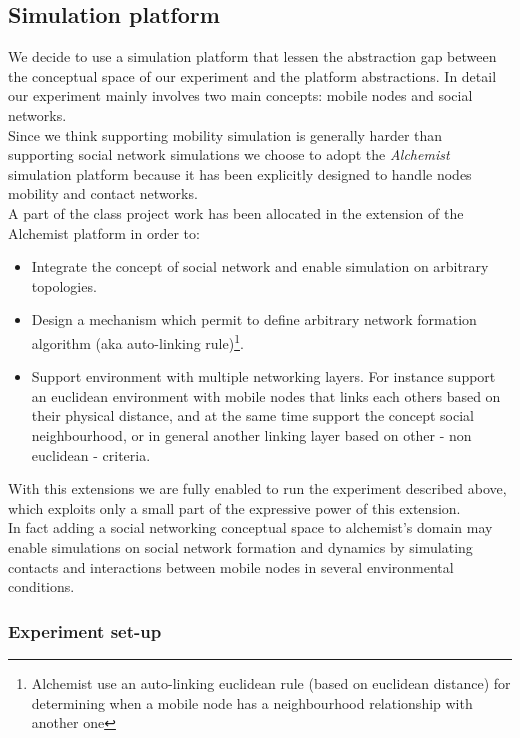 \subsection{Simulation platform}
\label{exp_platform}

We decide to use a simulation platform that lessen the abstraction gap between the conceptual space of our experiment and the platform abstractions. In detail our experiment mainly involves two main concepts: mobile nodes and social networks.\\
Since we think supporting mobility simulation is generally harder than supporting social network simulations we choose to adopt the \emph{Alchemist} simulation platform\cite{pianini-jos2013} because it has been explicitly designed to handle nodes mobility and contact networks.\\
A part of the class project work has been allocated in the extension of the Alchemist platform in order to: 
\begin{itemize}
\item Integrate the concept of social network and enable simulation on arbitrary topologies.
\item Design a mechanism which permit to define arbitrary network formation algorithm (aka auto-linking rule)\footnote{Alchemist use an auto-linking euclidean rule (based on euclidean distance) for determining when a mobile node has a neighbourhood relationship with another one}.
\item Support environment with multiple networking layers. For instance support an euclidean environment with mobile nodes that links each others based on their physical distance, and at the same time support the concept social neighbourhood, or in general another linking layer based on other - non euclidean - criteria.
\end{itemize}

With this extensions we are fully enabled to run the experiment described above, which exploits only a small part of the expressive power of this extension.\\
In fact adding a social networking conceptual space to alchemist's domain may enable simulations on social network formation and dynamics by simulating contacts and interactions between mobile nodes in several environmental conditions.\\

\subsubsection{Experiment set-up}
\label{exp_setup}

